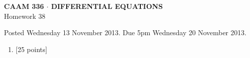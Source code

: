 \documentclass[10pt]{article}
\begin{document}
\vspace*{-5em}
\begin{center}
\large \textsf{\textbf{CAAM 336 $\cdot$ DIFFERENTIAL EQUATIONS}\\[0.5em]
Homework 38 }
\end{center}

Posted Wednesday 13 November 2013.  Due 5pm Wednesday 20 November 2013.

\begin{enumerate}\addtocounter{enumi}{37}
\item {[25 points]}  
\end{enumerate}
\end{document}

